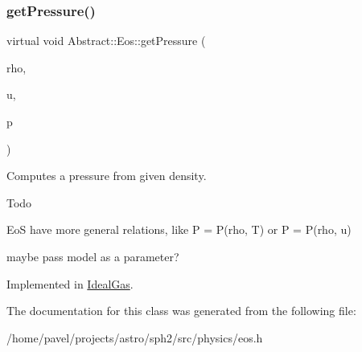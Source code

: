 \subsubsection{\texorpdfstring{get\+Pressure()}{getPressure()}}
{\footnotesize\ttfamily virtual void Abstract\+::\+Eos\+::get\+Pressure (\begin{DoxyParamCaption}\item[{\hyperlink{classArrayView}{Array\+View}$<$ const Float $>$}]{rho,  }\item[{\hyperlink{classArrayView}{Array\+View}$<$ const Float $>$}]{u,  }\item[{\hyperlink{classArrayView}{Array\+View}$<$ Float $>$}]{p }\end{DoxyParamCaption})\hspace{0.3cm}{\ttfamily [pure virtual]}}

Computes a pressure from given density. \begin{DoxyRefDesc}{Todo}
\item[\hyperlink{todo__todo000018}{Todo}]EoS have more general relations, like P = P(rho, T) or P = P(rho, u) 

maybe pass model as a parameter? \end{DoxyRefDesc}


Implemented in \hyperlink{classIdealGas_a27ee0a167bbb7e5690ce6db5fca39ba1}{Ideal\+Gas}.



The documentation for this class was generated from the following file\+:\begin{DoxyCompactItemize}
\item 
/home/pavel/projects/astro/sph2/src/physics/eos.\+h\end{DoxyCompactItemize}
